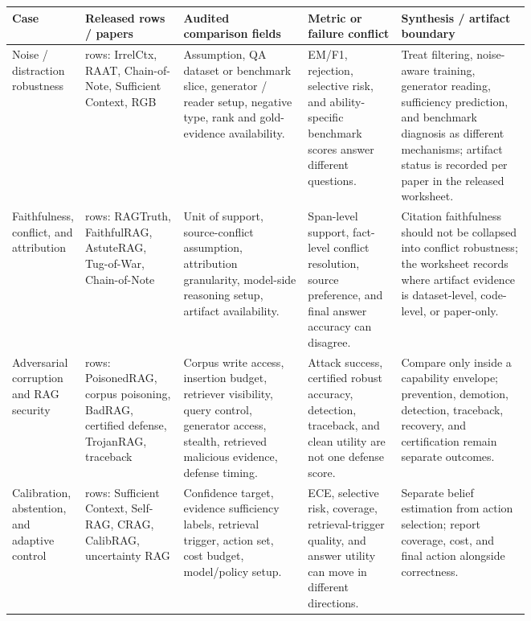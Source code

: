 \documentclass[11pt]{article}
\begin{document}

\begin{table}[t]
\centering
\scriptsize
\renewcommand{\arraystretch}{0.86}
\begin{tabularx}{\linewidth}{>{\raggedright\arraybackslash}p{0.14\linewidth}>{\raggedright\arraybackslash}p{0.19\linewidth}>{\raggedright\arraybackslash}p{0.24\linewidth}>{\raggedright\arraybackslash}p{0.18\linewidth}X}
\toprule
\textbf{Case} & \textbf{Released rows / papers} & \textbf{Audited comparison fields} & \textbf{Metric or failure conflict} & \textbf{Synthesis / artifact boundary} \\
\midrule
Noise / distraction robustness & 5 rows: IrrelCtx, RAAT, Chain-of-Note, Sufficient Context, RGB & Assumption, QA dataset or benchmark slice, generator / reader setup, negative type, rank and gold-evidence availability. & EM/F1, rejection, selective risk, and ability-specific benchmark scores answer different questions. & Treat filtering, noise-aware training, generator reading, sufficiency prediction, and benchmark diagnosis as different mechanisms; artifact status is recorded per paper in the released worksheet. \\
Faithfulness, conflict, and attribution & 5 rows: RAGTruth, FaithfulRAG, AstuteRAG, Tug-of-War, Chain-of-Note & Unit of support, source-conflict assumption, attribution granularity, model-side reasoning setup, artifact availability. & Span-level support, fact-level conflict resolution, source preference, and final answer accuracy can disagree. & Citation faithfulness should not be collapsed into conflict robustness; the worksheet records where artifact evidence is dataset-level, code-level, or paper-only. \\
Adversarial corruption and RAG security & 6 rows: PoisonedRAG, corpus poisoning, BadRAG, certified defense, TrojanRAG, traceback & Corpus write access, insertion budget, retriever visibility, query control, generator access, stealth, retrieved malicious evidence, defense timing. & Attack success, certified robust accuracy, detection, traceback, and clean utility are not one defense score. & Compare only inside a capability envelope; prevention, demotion, detection, traceback, recovery, and certification remain separate outcomes. \\
Calibration, abstention, and adaptive control & 5 rows: Sufficient Context, Self-RAG, CRAG, CalibRAG, uncertainty RAG & Confidence target, evidence sufficiency labels, retrieval trigger, action set, cost budget, model/policy setup. & ECE, selective risk, coverage, retrieval-trigger quality, and answer utility can move in different directions. & Separate belief estimation from action selection; report coverage, cost, and final action alongside correctness. \\

\end{tabularx}
\end{table}
\end{document}
